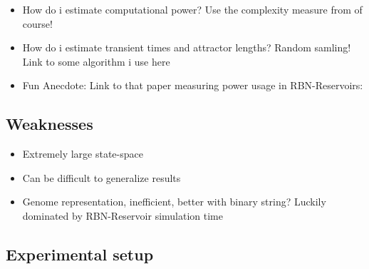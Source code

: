 \begin{itemize}
  \item
    How do i estimate computational power?
    Use the complexity measure from \cite{rbn-reservoir} of course!
  \item
    How do i estimate transient times and attractor lengths?
    Random samling! Link to some algorithm i use here
  \item
    Fun Anecdote: Link to that paper measuring power usage in RBN-Reservoirs:
    \cite{rbn-reservoir-energy-efficiency}
\end{itemize}

\subsection{Weaknesses}

\begin{itemize}
  \item Extremely large state-space
  \item Can be difficult to generalize results
  \item
    Genome representation, inefficient, better with binary string?
    Luckily dominated by RBN-Reservoir simulation time
\end{itemize}


\subsection{Experimental setup}

